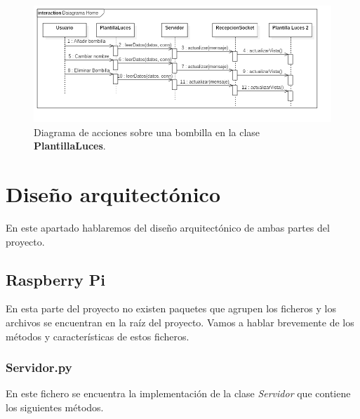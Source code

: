 \begin{figure}[h!]
	\centering
	\includegraphics[width=1.2\linewidth]{img/DiagramaPlantillaLuces}
	\caption{Diagrama de acciones sobre una bombilla en la clase \textbf{PlantillaLuces}.}
	\label{fig:DiagramaPlantillaLuces}
\end{figure}

\section{Diseño arquitectónico}

En este apartado hablaremos del diseño arquitectónico de ambas partes del proyecto.

\subsection{Raspberry Pi}

En esta parte del proyecto no existen paquetes que agrupen los ficheros y los archivos se encuentran en la raíz del proyecto. Vamos a hablar brevemente de los métodos y características de estos ficheros.

\subsubsection{Servidor.py}

En este fichero se encuentra la implementación de la clase \textit{Servidor} que contiene los siguientes métodos.

